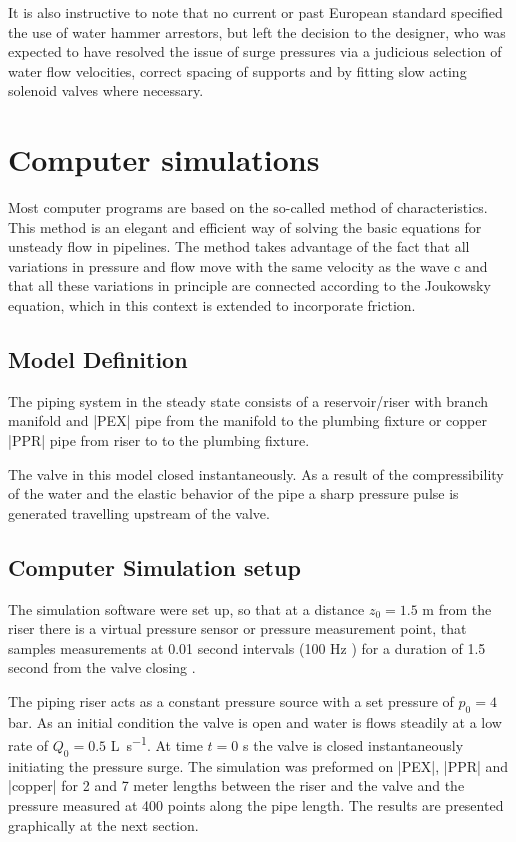 It is also instructive to note that no current or past European standard specified the use of water hammer arrestors, but left the decision to the designer, who was expected to have resolved the issue of surge pressures via a judicious selection of water flow velocities, correct spacing of supports and by fitting slow acting solenoid valves where necessary. 

\section{Computer simulations}

Most computer programs are based on the so-called method of characteristics. This
method is an elegant and efficient way of solving the basic equations for unsteady flow
in pipelines. The method takes advantage of the fact that all variations in pressure and
flow move with the same velocity as the wave c and that all these variations in principle
are connected according to the Joukowsky equation, which in this context is extended to
incorporate friction.

\subsection{Model Definition}

The piping system in the steady state consists of a reservoir/riser with branch manifold
and |PEX| pipe from the manifold to the plumbing fixture or copper |PPR| pipe from riser
to to the plumbing fixture.

The valve in this model closed instantaneously. As a result of the compressibility of the
water and the elastic behavior of the pipe a sharp pressure pulse is generated travelling
upstream of the valve.

\subsection{Computer Simulation setup}

The simulation software were set up, so that at a distance $z_{0} = 1.5$ m from the riser there is a virtual pressure sensor or pressure measurement point, that  samples measurements at 0.01 second intervals 
(100 Hz ) for a duration of 1.5 second from the valve closing . 

The piping riser acts as a constant pressure source with a set pressure of $p_0 = 4$ bar. As an initial condition the valve is open and
water is flows steadily at a low rate of $Q_0 = 0.5$ \si{\liter\per\second}.  At time $t = 0$ s the valve is
closed instantaneously initiating the pressure surge. The simulation was preformed on
|PEX|, |PPR| and |copper| for 2 and 7 meter lengths between the riser and the valve and the
pressure measured at 400 points along the pipe length. The results are presented graphically at the next section.


